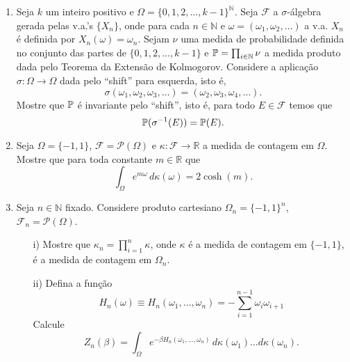 \begin{enumerate}[leftmargin=*]
\item
Seja $k$ um inteiro positivo e 
$\Omega=\{0,1,2,\ldots,k-1\}^{\mathbb{N}}$. 
Seja $\mathcal{F}$ a $\sigma$-álgebra gerada 
pelas v.a.'s $\{X_n\}$, onde para 
cada $n\in\mathbb{N}$ e $\omega=(\omega_1,\omega_2,\ldots)$ 
a v.a. $X_n$ é definida por $X_n(\omega)=\omega_n$. 
Sejam $\nu$ uma medida de probabilidade definida no conjunto das partes
de $\{0,1,2,\ldots,k-1\}$ e $\P = \prod_{i\in\mathbb{N}}\nu$ 
a medida produto dada pelo Teorema da Extensão de Kolmogorov.
Considere a aplicação $\sigma:\Omega\to\Omega$ 
dada pelo ``shift'' para esquerda, isto é, 
	\[
		\sigma(\omega_1,\omega_2,\omega_3,\ldots)
		=
		(\omega_2,\omega_3,\omega_4,\ldots).
	\] 
Mostre que $\P$ é invariante pelo ``shift'', isto é, 
para todo $E\in\mathcal{F}$ temos que 
	\[
	\P(\sigma^{-1}(E)) = \P(E).
	\] 











\item
Seja $\Omega=\{-1,1\}$, $\mathcal{F}=\mathcal{P}(\Omega)$ e 
$\kappa:\mathcal{F}\to \mathbb{R}$ 
a medida de contagem em $\Omega$.
Mostre que para toda constante $m\in\mathbb{R}$ que
\[
	\int_{\Omega} e^{m\omega}\, d\kappa(\omega)
	=
	2\cosh(m).
\]


\item 
Seja $n\in\mathbb{N}$ fixado. 
Considere produto cartesiano $\Omega_n=\{-1,1\}^n$, 
$\mathcal{F}_n=\mathcal{P}(\Omega)$.

\begin{itemize}

\item[i)]
Mostre que  
$\kappa_n = \prod_{i=1}^n \kappa$, 
onde $\kappa$ é a medida de contagem em $\{-1,1\}$, 
é a medida de contagem em $\Omega_n$.


\item[ii)]
Defina a função 
\[
	H_n(\omega)
	\equiv
	H_n(\omega_1,\ldots,\omega_n)
	= 
	-\sum_{i=1}^{n-1} \omega_i\omega_{i+1}
\]
Calcule
\[
	Z_n(\beta)
	=
	\int_{\Omega} 
	e^{-\beta H_n(\omega_1,\ldots,\omega_n)}\, 
	d\kappa(\omega_1)\ldots d\kappa(\omega_n).
	\]
\end{itemize}


\end{enumerate}